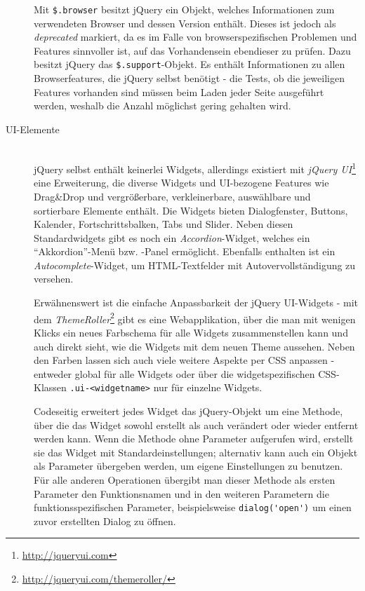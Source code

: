 \begin{description}
Mit \lstinline{$.browser} besitzt jQuery ein Objekt, welches Informationen zum verwendeten Browser
und dessen Version enthält. Dieses ist jedoch als \emph{deprecated} markiert, da es im Falle von
browserspezifischen Problemen und Features sinnvoller ist, auf das Vorhandensein ebendieser zu
prüfen. Dazu besitzt jQuery das \lstinline{$.support}-Objekt. Es enthält Informationen zu allen
Browserfeatures, die jQuery selbst benötigt - die Tests, ob die jeweiligen Features vorhanden sind
müssen beim Laden jeder Seite ausgeführt werden, weshalb die Anzahl möglichst gering gehalten wird.

\item[UI-Elemente] \hfill \\
jQuery selbst enthält keinerlei Widgets, allerdings existiert mit \emph{jQuery
UI}\footnote{\href{http://jqueryui.com}{http://jqueryui.com}} eine Erweiterung, die diverse Widgets
und UI-bezogene Features wie Drag\&Drop und vergrößerbare, verkleinerbare, auswählbare und
sortierbare Elemente enthält. Die Widgets bieten Dialogfenster, Buttons, Kalender,
Fortschrittsbalken, Tabs und Slider. Neben diesen Standardwidgets gibt es noch ein
\emph{Accordion}-Widget, welches ein \enquote{Akkordion}-Menü bzw. -Panel ermöglicht. Ebenfalls
enthalten ist ein \emph{Autocomplete}-Widget, um HTML-Textfelder mit Autovervollständigung zu
versehen.


Erwähnenswert ist die einfache Anpassbarkeit der jQuery UI-Widgets - mit dem
\emph{ThemeRoller}\footnote{\href{http://jqueryui.com/themeroller/}{http://jqueryui.com/themeroller/}}
gibt es eine Webapplikation, über die man mit wenigen Klicks ein neues Farbschema für alle Widgets
zusammenstellen kann und auch direkt sieht, wie die Widgets mit dem neuen Theme aussehen. Neben den
Farben lassen sich auch viele weitere Aspekte per CSS anpassen - entweder global für alle Widgets
oder über die widgetspezifischen CSS-Klassen \lstinline{.ui-<widgetname>} nur für einzelne Widgets.

Codeseitig erweitert jedes Widget das jQuery-Objekt um eine Methode, über die das Widget sowohl
erstellt als auch verändert oder wieder entfernt werden kann. Wenn die Methode ohne Parameter
aufgerufen wird, erstellt sie das Widget mit Standardeinstellungen; alternativ kann auch ein Objekt
als Parameter übergeben werden, um eigene Einstellungen zu benutzen. Für alle anderen Operationen
übergibt man dieser Methode als ersten Parameter den Funktionsnamen und in den weiteren Parametern
die funktionsspezifischen Parameter, beispielsweise \lstinline{dialog('open')} um einen zuvor
erstellten Dialog zu öffnen.


\end{description}

